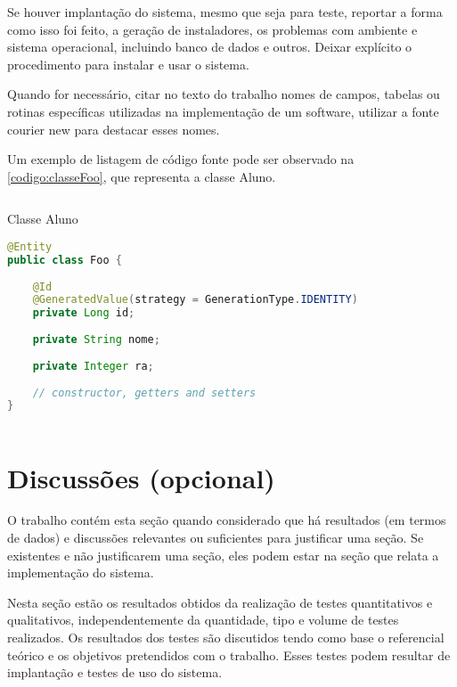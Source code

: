 Se houver implantação do sistema, mesmo que seja para teste, reportar a forma como isso foi feito, a geração de instaladores, os problemas com ambiente e sistema operacional, incluindo banco de dados e outros. Deixar explícito o procedimento para instalar e usar o sistema.

Quando for necessário, citar no texto do trabalho nomes de campos, tabelas ou rotinas específicas utilizadas na implementação de um software, utilizar a fonte courier new para destacar esses nomes.

Um exemplo de listagem de código fonte pode ser observado na \autoref{codigo:classeFoo}, que representa a classe Aluno.

\begin{sourcecode}[htb]
\caption{\label{codigo:classeFoo}Classe Aluno}
\begin{lstlisting}[frame=single, language=Java]
@Entity
public class Foo {
 
    @Id
    @GeneratedValue(strategy = GenerationType.IDENTITY)
    private Long id;
 
    private String nome;
    
    private Integer ra;
     
    // constructor, getters and setters
}
\end{lstlisting}
\fonte{}
\end{sourcecode}

\section{Discussões (opcional)}\label{sec:discussoes} 

O trabalho contém esta seção quando considerado que há resultados (em termos de dados) e discussões relevantes ou suficientes para justificar uma seção. Se existentes e não justificarem uma seção, eles podem estar na seção que relata a implementação do sistema.

Nesta seção estão os resultados obtidos da realização de testes quantitativos e qualitativos, independentemente da quantidade, tipo e volume de testes realizados. Os resultados dos testes são discutidos tendo como base o referencial teórico e os objetivos pretendidos com o trabalho. Esses testes podem resultar de implantação e testes de uso do sistema. 
